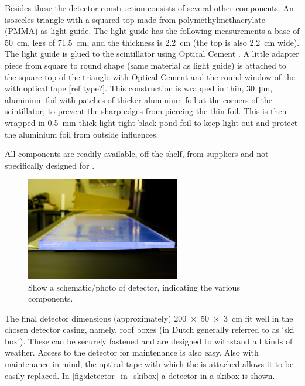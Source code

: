Besides these the detector construction consists of several other components. An isosceles triangle with a squared top made from polymethylmethacrylate (PMMA) as light guide. The light guide has the following measurements a base of \SI{50}{\centi\meter}, legs of \SI{71.5}{\centi\meter}, and the thickness is \SI{2.2}{\centi\meter} (the top is also \SI{2.2}{\centi\meter} wide). The light guide is glued to the scintillator using Optical Cement \cite{sgc2014bc600}. A little adapter piece from square to round shape (same material as light guide) is attached to the square top of the triangle with Optical Cement and the round window of the \pmt with optical tape [ref type?]. This construction is wrapped in thin, \SI{30}{\micro\meter}, aluminium foil with patches of thicker aluminium foil at the corners of the scintillator, to prevent the sharp edges from piercing the thin foil. This is then wrapped in \SI{0.5}{\milli\meter} thick light-tight black pond foil to keep light out and protect the aluminium foil from outside influences.

All components are readily available, off the shelf, from suppliers and not specifically designed for \hisparc.

\begin{figure}
    \centering
    \includegraphics[width=0.6\textwidth]
                    {plots/station/ADL_115651.jpg}
    \caption{Show a schematic/photo of detector, indicating the various components.}
    \label{fig:schematic_detector}
\end{figure}

The final detector dimensions (approximately) \SI[product-units=power]{200 x 50 x 3}{\centi\meter} fit well in the chosen detector casing, namely, roof boxes (in Dutch generally referred to as `ski box'). These can be securely fastened and are designed to withstand all kinds of weather. Access to the detector for maintenance is also easy. Also with maintenance in mind, the optical tape with which the \pmt is attached allows it to be easily replaced. In \cref{fig:detector_in_skibox} a detector in a skibox is shown.

